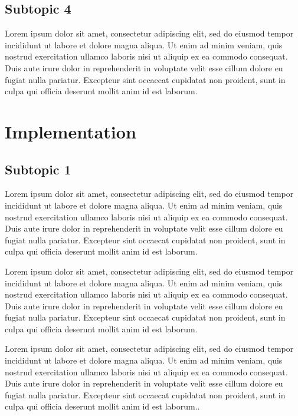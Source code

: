 \documentclass[a4paper,12 pt,oneside]{book}
\begin{document}
\section{Subtopic 4}

Lorem ipsum dolor sit amet, consectetur adipiscing elit, sed do eiusmod tempor incididunt ut labore et dolore magna aliqua. Ut enim ad minim veniam, quis nostrud exercitation ullamco laboris nisi ut aliquip ex ea commodo consequat. Duis aute irure dolor in reprehenderit in voluptate velit esse cillum dolore eu fugiat nulla pariatur. Excepteur sint occaecat cupidatat non proident, sunt in culpa qui officia deserunt mollit anim id est laborum.

\chapter{Implementation}

\section{Subtopic 1}

Lorem ipsum dolor sit amet, consectetur adipiscing elit, sed do eiusmod tempor incididunt ut labore et dolore magna aliqua. Ut enim ad minim veniam, quis nostrud exercitation ullamco laboris nisi ut aliquip ex ea commodo consequat. Duis aute irure dolor in reprehenderit in voluptate velit esse cillum dolore eu fugiat nulla pariatur. Excepteur sint occaecat cupidatat non proident, sunt in culpa qui officia deserunt mollit anim id est laborum.

Lorem ipsum dolor sit amet, consectetur adipiscing elit, sed do eiusmod tempor incididunt ut labore et dolore magna aliqua. Ut enim ad minim veniam, quis nostrud exercitation ullamco laboris nisi ut aliquip ex ea commodo consequat. Duis aute irure dolor in reprehenderit in voluptate velit esse cillum dolore eu fugiat nulla pariatur. Excepteur sint occaecat cupidatat non proident, sunt in culpa qui officia deserunt mollit anim id est laborum.


Lorem ipsum dolor sit amet, consectetur adipiscing elit, sed do eiusmod tempor incididunt ut labore et dolore magna aliqua. Ut enim ad minim veniam, quis nostrud exercitation ullamco laboris nisi ut aliquip ex ea commodo consequat. Duis aute irure dolor in reprehenderit in voluptate velit esse cillum dolore eu fugiat nulla pariatur. Excepteur sint occaecat cupidatat non proident, sunt in culpa qui officia deserunt mollit anim id est laborum.\cite{spacy}.
\end{document}
